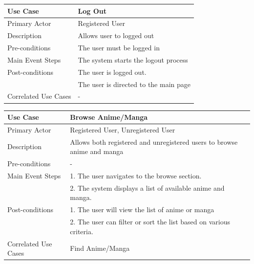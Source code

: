 \begin{longtable}{|p{}|p{}|}
    \hline
    \rowcolor{lightblue}
    \textbf{Use Case} & \textbf{Log Out} \\
    \hline
    Primary Actor &Registered User\\
    \hline
    Description & Allows user to logged out\\
    \hline
    Pre-conditions & The user must be logged in\\
    \hline
    Main Event Steps & The system starts the logout process \\
    \hline
    Post-conditions &The user is logged out. \\
    & The user is directed to the main page \\
    \hline
    Correlated Use Cases &-\\
    \hline
\end{longtable}

\newpage

\begin{longtable}{|p{}|p{}|}
    \hline
    \rowcolor{lightblue}
    \textbf{Use Case} & \textbf{Browse Anime/Manga} \\
    \hline
    Primary Actor & Registered User, Unregistered User\\
    \hline
    Description & Allows both registered and unregistered users to browse anime and manga\\
    \hline
    Pre-conditions & - \\
    \hline
    Main Event Steps & 1. The user navigates to the browse section. \\
    & 2. The system displays a list of available anime and manga. \\
    \hline
    Post-conditions & 1. The user will view the list of anime or manga\\
    & 2. The user can filter or sort the list based on various criteria. \\
    \hline
    Correlated Use Cases & Find Anime/Manga\\
    \hline
\end{longtable}


